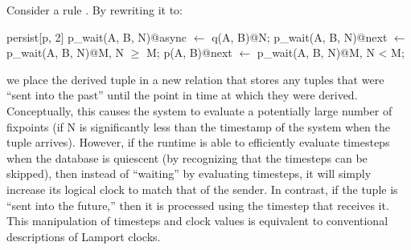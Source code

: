 Consider a rule .  By
rewriting it to:

\begin{Dedalus}
persist[p, 2]
p\_wait(A, B, N)@async \(\leftarrow\) q(A, B)@N;
p\_wait(A, B, N)@next \(\leftarrow\) p\_wait(A, B, N)@M, N \(\ge\) M;
p(A, B)@next \(\leftarrow\) p\_wait(A, B, N)@M, N < M;
\end{Dedalus}

we place the derived tuple in a new relation  that
stores any tuples that were ``sent into the past'' until the point in
time at which they were derived.  Conceptually, this causes the system
to evaluate a potentially large number of fixpoints (if N is
significantly less than the timestamp of the system when the tuple
arrives).  However, if the runtime is able to efficiently evaluate
timesteps when the database is quiescent (by recognizing that the
timesteps can be skipped), then instead of ``waiting'' by evaluating
timesteps, it will simply increase its logical clock to match that of
the sender.  In contrast, if the tuple is ``sent into the future,''
then it is processed using the timestep that receives it.  This
manipulation of timesteps and clock values is equivalent to
conventional descriptions of Lamport clocks.



